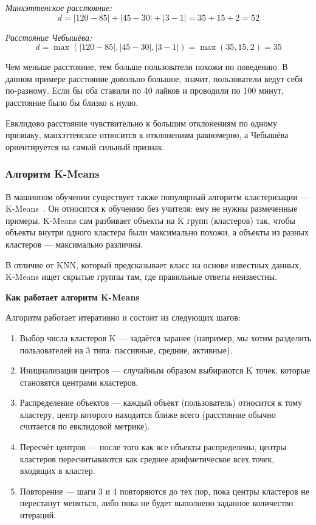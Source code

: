 \documentclass[14pt, a4paper]{extarticle}
\begin{document}
\textit{Манхэттенское расстояние:}
\[
d = |120-85| + |45-30| + |3-1| = 35 + 15 + 2 = 52
\]

\textit{Расстояние Чебышёва:}
\[
d = \max(|120-85|, |45-30|, |3-1|) = \max(35, 15, 2) = 35
\]

Чем меньше расстояние, тем больше пользователи похожи по поведению. В данном примере расстояние довольно большое, значит, пользователи ведут себя по-разному. Если бы оба ставили по 40 лайков и проводили по 100 минут, расстояние было бы близко к нулю.

Евклидово расстояние чувствительно к большим отклонениям по одному признаку, манхэттенское относится к отклонениям равномерно, а Чебышёва ориентируется на самый сильный признак.

\subsubsection{Алгоритм K-Means}

В машинном обучении существует также популярный алгоритм кластеризации — K-Means~\cite{macqueen}. Он относится к обучению без учителя: ему не нужны размеченные примеры. K-Means сам разбивает объекты на K групп (кластеров) так, чтобы объекты внутри одного кластера были максимально похожи, а объекты из разных кластеров — максимально различны.

В отличие от KNN, который предсказывает класс на основе известных данных, K-Means ищет скрытые группы там, где правильные ответы неизвестны.

\textbf{Как работает алгоритм K-Means}
\smallskip

Алгоритм работает итеративно и состоит из следующих шагов:

\begin{enumerate}
    \item Выбор числа кластеров K — задаётся заранее (например, мы хотим разделить пользователей на 3 типа: пассивные, средние, активные).
    \item Инициализация центров — случайным образом выбираются K точек, которые становятся центрами кластеров.
    \item Распределение объектов — каждый объект (пользователь) относится к тому кластеру, центр которого находится ближе всего (расстояние обычно считается по евклидовой метрике).
    \item Пересчёт центров — после того как все объекты распределены, центры кластеров пересчитываются как среднее арифметическое всех точек, входящих в кластер.
    \item Повторение — шаги 3 и 4 повторяются до тех пор, пока центры кластеров не перестанут меняться, либо пока не будет выполнено заданное количество итераций.
\end{enumerate}
\end{document}
